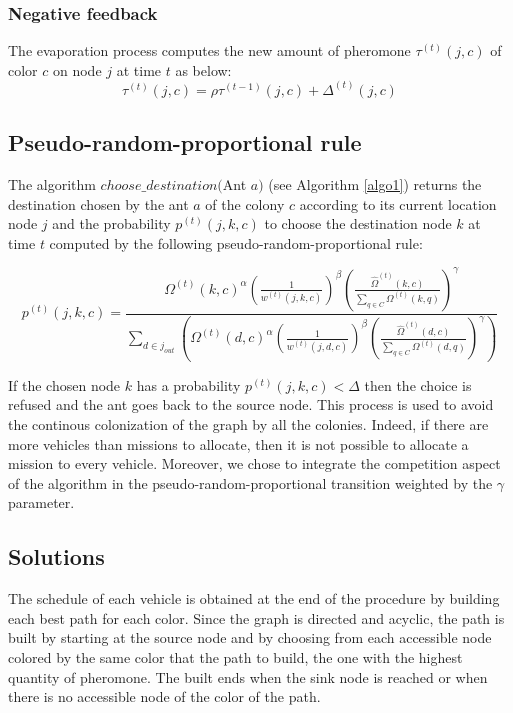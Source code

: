 \documentclass[a4paper,10pt]{article}
\begin{document}
\subsubsection{Negative feedback}
The evaporation process computes the new amount of pheromone $\tau^{(t)}(j,c)$ of color $c$ on node $j$ at time $t$ as below:
\begin{equation*}
 \tau^{(t)}(j,c) = \rho \tau^{(t-1)}(j,c) + \Delta^{(t)}(j,c)
\end{equation*}

\subsection{Pseudo-random-proportional rule}
The algorithm $choose\_destination($Ant $a)$ (see Algorithm \ref{algo1}) returns the destination chosen by the ant $a$ of the colony $c$ according to its current location node $j$ and the probability $p^{(t)}(j,k,c)$ to choose the destination node $k$ at time $t$ computed by the following pseudo-random-proportional rule:

\begin{equation*}
  p^{(t)}(j,k,c) = \frac
    {
      \Omega^{(t)}(k,c)^{\alpha}
      \left( \frac{1}{w^{(t)}(j,k,c)} \right) ^{\beta}
      \left( \frac{\hat \Omega^{(t)}(k,c)}{\sum_{q \in C} \Omega^{(t)}(k,q)} \right)^{\gamma}
    }
    {
      \sum_{d \in j_{out}} \left(
	\Omega^{(t)}(d,c)^{\alpha}
	\left( \frac{1}{w^{(t)}(j,d,c)} \right)^{\beta}
	\left( \frac{\hat \Omega^{(t)}(d,c)}{\sum_{q \in C} \Omega^{(t)}(d,q)} \right)^{\gamma}
      \right)
    }
\end{equation*}

If the chosen node $k$ has a probability $p^{(t)}(j,k,c) < \Delta$ then the choice is refused and the ant goes back to the source node. This process is used to avoid the continous colonization of the graph by all the colonies. Indeed, if there are more vehicles than missions to allocate, then it is not possible to allocate a mission to every vehicle. Moreover, we chose to integrate the competition aspect of the algorithm in the pseudo-random-proportional transition weighted by the $\gamma$ parameter.

\subsection{Solutions}
The schedule of each vehicle is obtained at the end of the procedure by building each best path for each color. Since the graph is directed and acyclic, the path is built by starting at the source node and by choosing from each accessible node colored by the same color that the path to build, the one with the highest quantity of pheromone. The built ends when the sink node is reached or when there is no accessible node of the color of the path.
\end{document}

